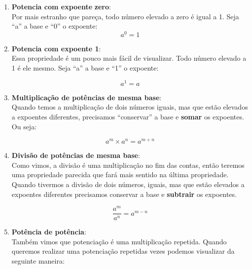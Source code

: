 \begin{enumerate}
    \item \textbf{Potencia com expoente} \textbf{zero}:\\
    
    Por mais estranho que pareça, todo número elevado a zero é igual a 1. Seja ``a'' a base e ``0'' o expoente:
    \begin{equation}
        a^0=1
    \end{equation}
    
    \item \textbf{Potencia  com expoente 1}:\\

    Essa propriedade é um pouco mais fácil de visualizar. Todo número elevado a 1 é ele mesmo. Seja ``a'' a base e ``1'' o expoente:

    \begin{equation}
        a^1=a
    \end{equation}
    
    \item \textbf{Multiplicação de potências de mesma base}:\\

    Quando temos a multiplicação de dois números iguais, mas que estão elevados a expoentes diferentes, precisamos ``conservar'' a base e \textbf{somar} os expoentes. Ou seja:

    \begin{equation}
        a^m\times a^n = a^{m+n}
    \end{equation}
    
    \item \textbf{Divisão de potências de mesma base}:\\

    Como vimos, a divisão é uma multiplicação no fim das contas, então teremos uma propriedade parecida que fará mais sentido na última propriedade. Quando tivermos a divisão de dois números, iguais, mas que estão elevados a expoentes diferentes precisamos conservar a base e \textbf{subtrair} os expoentes.

    \begin{equation}
        \frac{a^m}{a^n}=a^{m-n}
    \end{equation}
    
    \item \textbf{Potência de potência}:\\

    Também vimos que potenciação é uma multiplicação repetida. Quando queremos realizar uma potenciação repetidas vezes podemos visualizar da seguinte maneira:


\end{enumerate}
